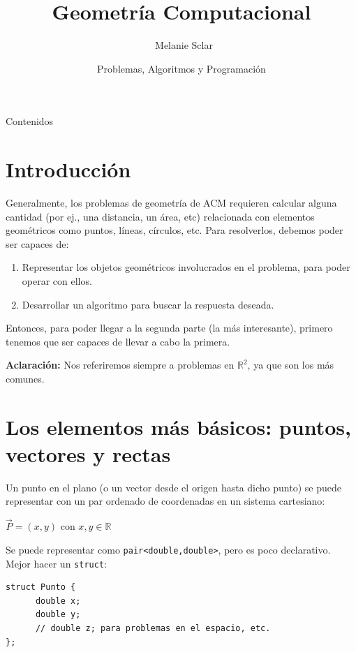 \documentclass[compress]{beamer}
\title[Geometr\'ia Computacional] %
{Geometr\'ia Computacional}
\author[Melanie Sclar] %
{~Melanie Sclar}
\institute[UBA] %
{
  Facultad de Ciencias Exactas y Naturales\\
  Universidad de Buenos Aires
}
\date[PAP] %
{Problemas, Algoritmos y Programación}
\begin{document}
\begin{frame}
  \titlepage
\end{frame}

\begin{frame}{Contenidos}
  \tableofcontents
\end{frame}

\section{Introducci\'on}
\begin{frame}

Generalmente, los problemas de geometr\'ia de ACM requieren calcular 
alguna cantidad (por ej., una distancia, un \'area, etc) relacionada con
elementos geom\'etricos como puntos, l\'ineas, c\'irculos, etc.
Para resolverlos, debemos poder ser capaces de:\\
\bigskip
\begin{enumerate}
\item Representar los objetos geom\'etricos involucrados en el problema, 
para poder operar con ellos.

\item Desarrollar un algoritmo para buscar la respuesta deseada.
\end{enumerate}

Entonces, para poder llegar a la segunda parte (la m\'as interesante), primero tenemos que ser capaces de llevar a cabo la primera.

\bigskip

\textbf{Aclaraci\'on:} Nos referiremos siempre a problemas en $\mathbb{R}^2$, ya que son los m\'as comunes.

\end{frame}

\section{Los elementos m\'as b\'asicos: puntos, vectores y rectas}
\begin{frame}[fragile]
Un punto en el plano (o un vector desde el origen hasta dicho punto) se puede representar con un par ordenado de coordenadas en un sistema cartesiano:

\begin{center}
$\vec{P} = (x,y)$ con $x,y \in \mathbb{R}$
\end{center}

\bigskip

Se puede representar como {\tt pair<double,double>}, pero es poco declarativo. Mejor hacer un {\tt struct}:

\begin{lstlisting}
struct Punto {
      double x;
      double y;
      // double z; para problemas en el espacio, etc.
};
\end{lstlisting}

\end{frame}
\end{document}
